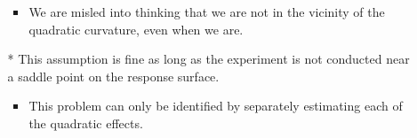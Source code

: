 \begin{itemize}
\begin{itemize}
\begin{itemize}[$\hookrightarrow$]
                        \item We are misled into thinking that we are not in the vicinity of the quadratic curvature, even when we are.
                    \end{itemize}
              \item[*] This assumption is fine as long as the experiment is not conducted near a saddle point on the
                  response surface.
                  \begin{itemize}[$\hookrightarrow$]
                      \item This problem can only be identified by separately estimating each of the quadratic effects.
                  \end{itemize}
          \end{itemize}
\end{itemize}

